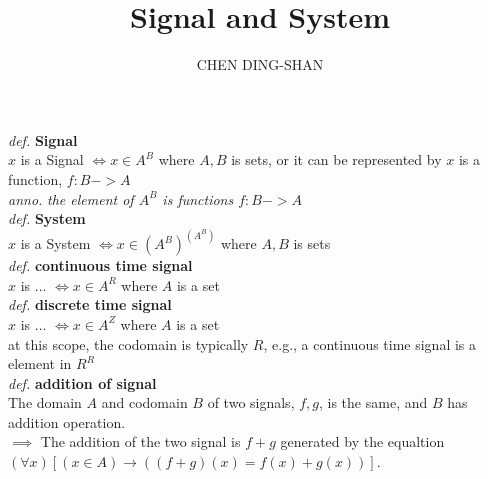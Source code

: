 \documentclass{article}
\title{Signal and System}
\author{CHEN DING-SHAN}
\newcommand{\sd}[1]{{\left(#1\right)}}
\newcommand{\df}[1]{\emph{def.} \textbf{#1}}
\newcommand{\anno}[1]{\emph{anno.} \emph{#1}}
\newcommand{\md}[1]{{\left[#1\right]}}
\begin{document}
\df{Signal}\\
$x$ is a Signal $\iff x \in A^B$ where $A, B$ is sets, or it can be represented by $x$ is a function, $f:B -> A$\\
\anno{the element of $A^B$ is functions $f:B -> A$}\\
\df{System}\\
$x$ is a System $\iff x \in \sd{A^B}^\sd{A^B}$ where $A, B$ is sets\\
\df{continuous time signal}\\
$x$ is ... $\iff x \in A^R$ where $A$ is a set\\
\df{discrete time signal}\\
$x$ is ... $\iff x \in A^Z$ where $A$ is a set\\
at this scope, the codomain is typically $R$, e.g., a continuous time signal is a element in $R^R$\\
\df{addition of signal}\\
The domain $A$ and codomain $B$ of two signals, $f,g$, is the same, and $B$ has addition operation.\\
$\implies$ The addition of the two signal is $f+g$ generated by the equaltion $\sd{\forall x}\md{\sd{x \in A} \to \sd{\sd{f+g}\sd{x} = f\sd{x} + g\sd{x}}}$.\\
\end{document}
